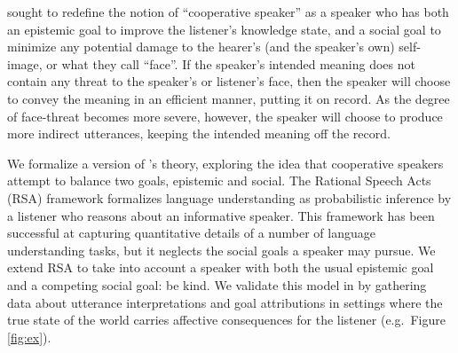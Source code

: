 \documentclass[10pt,letterpaper]{article}
\begin{document}
 sought to redefine the notion of ``cooperative speaker'' as a speaker 
who has both an epistemic goal to improve the listener's knowledge state, 
and a social goal to minimize any potential damage to the hearer's (and the speaker's own) self-image, or what they call ``face''.
If the speaker's intended meaning does not contain any threat to the speaker's or listener's face, 
then the speaker will choose to convey the meaning in an efficient manner, putting it on record. 
As the degree of face-threat becomes more severe, however, 
the speaker will choose to produce more indirect utterances, keeping the intended meaning off the record.

We formalize a version of 's theory, exploring the idea that cooperative speakers attempt to balance two goals, epistemic and social.
The Rational Speech Acts (RSA) framework \cite{Frank2012, Goodman2013} formalizes language understanding as probabilistic inference by a listener who reasons about an informative speaker. This framework has been successful at capturing quantitative details of a number of language understanding tasks, but it neglects the social goals a speaker may pursue. 
We extend RSA to take into account a speaker with both the usual epistemic goal and a competing social goal: be kind.
We validate this model in by gathering data about utterance interpretations and goal attributions in settings where the true state of the world carries affective consequences for the listener (e.g.~Figure \ref{fig:ex}).
\end{document}
